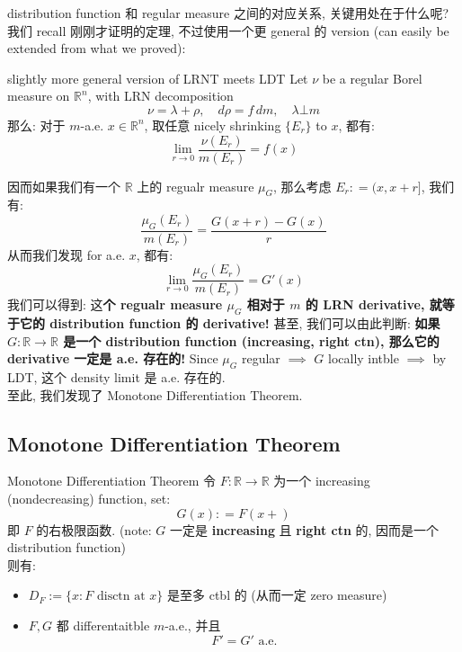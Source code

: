 \documentclass[lang=cn,11pt]{elegantbook}
\begin{document}
distribution function 和 regular measure 之间的对应关系, 关键用处在于什么呢?  
我们 recall 刚刚才证明的定理, 不过使用一个更 general 的 version (can easily be extended from what we proved):
\begin{theorem}{slightly more general version of LRNT meets LDT}
    Let $\nu$ be a regular Borel measure on $\mathbb{R}^n$, with LRN decomposition $$\nu = \lambda + \rho, \quad d\rho = f \, dm,\quad  \lambda \bot m$$那么:  对于 $m$-a.e. $x\in \mathbb{R}^n$, 取任意 nicely shrinking $\{E_r\}$ to $x$, 都有: \[
    \lim_{r \to 0} \frac{\nu(E_r)}{m(E_r)}  = f(x)
    \]
\end{theorem}
因而如果我们有一个 $\mathbb{R}$ 上的 regualr measure $\mu_G  $, 那么考虑  $E_r : = (x,x+r]$, 我们有:
\[
\frac{\mu_G(E_r)}{m(E_r)}  = \frac{G(x+r)-G(x)}{r}
\]
从而我们发现 for a.e. $x$, 都有:  \[
\lim_{r\to 0}\frac{\mu_G(E_r)}{m(E_r)}  = G'(x)
\]
我们可以得到: 这\textbf{个 regualr measure $\mu_G  $ 相对于 $m$ 的 LRN derivative, 就等于它的 distribution function 的 derivative!}
甚至, 我们可以由此判断:\textbf{ 如果 $G:\mathbb{R}\to\mathbb{R}$ 是一个 distribution function (increasing, right ctn), 那么它的 derivative 一定是 a.e. 存在的!} Since $\mu_G  $ regular $\implies$ $G$ locally intble $\implies$ by LDT, 这个 density limit 是 a.e. 存在的.\\
至此, 我们发现了 Monotone Differentiation Theorem.\\


\subsection{Monotone Differentiation Theorem}
\begin{theorem}{Monotone Differentiation Theorem}
令 $F: \mathbb{R} \to \mathbb{R}$ 为一个 increasing (nondecreasing) function, set: \[
G(x) : = F(x+)
\]即 $F$ 的右极限函数. (note: $G$ 一定是 \textbf{increasing} 且 \textbf{right ctn} 的, 因而是一个 distribution function)\\
则有: 
\begin{itemize}
    \item $D_F := \{x: F \text{ disctn at } x \}$ 是至多 ctbl 的 (从而一定 zero measure)
    \item $F,G$ 都 differentaitble $m$-a.e., 并且 $$F' = G' \text{ a.e.}$$
\end{itemize}
\end{theorem}
\end{document}
